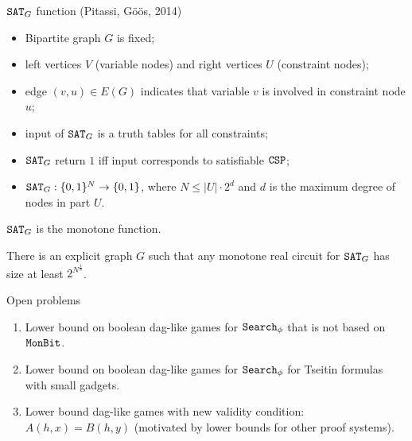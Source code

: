 \begin{frame}{$\mathtt{SAT}_{G}$ function (Pitassi, G{\"{o}}{\"{o}}s, 2014)}

    \begin{itemize}
        \pause
        \item Bipartite graph $G$ is fixed;
        \pause
        \item left vertices $V$ (variable nodes) and right vertices $U$ (constraint nodes);
        \pause
        \item edge $(v, u) \in E(G)$ indicates that variable $v$ is involved in constraint node $u$;
        \pause
        \item input of $\mathtt{SAT}_{G}$ is a truth tables for all constraints;
        \pause
        \item $\mathtt{SAT}_{G}$ return $1$ iff input corresponds to satisfiable $\mathtt{CSP}$;
        \pause
        \item $\mathtt{SAT}_{G}: \{0, 1\}^N \to \{0, 1\}$, where $N \le |U| \cdot 2^d$ and $d$ is the maximum degree of nodes in part
            $U$.
    \end{itemize}

    $\mathtt{SAT}_{G}$ is the monotone function.

    \pause
    \begin{theorem}[S 2016, unp.]
        There is an explicit graph $G$ such that any monotone real circuit for $\mathtt{SAT}_{G}$ has size at least $2^{N^{\frac{1}{8}}}$.
    \end{theorem}
\end{frame}

\begin{frame}{Open problems}
    \begin{enumerate}
        \pause
        \item Lower bound on boolean dag-like games for $\mathtt{Search}_{\phi}$ that is not based on $\mathtt{MonBit}$.
        \pause
        \item Lower bound on boolean dag-like games for $\mathtt{Search}_{\phi}$ for Tseitin formulas with small gadgets.
        \pause
        \item Lower bound dag-like games with new validity condition: $A(h, x) = B(h, y)$ (motivated by lower bounds for
            other proof systems).
    \end{enumerate}
\end{frame}